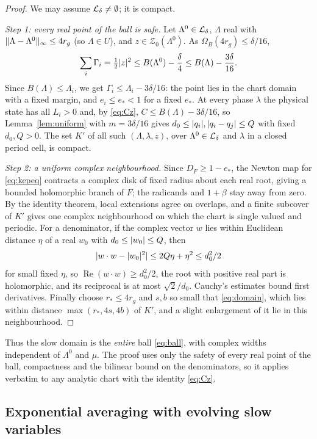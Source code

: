 \begin{proof}
We may assume $\mathcal{L}_\delta\neq\emptyset$; it is compact.

\emph{Step 1: every real point of the ball is safe.} Let $\Lambda^0\in\mathcal{L}_\delta$, $\Lambda$ real with $\lVert \Lambda-\Lambda^0\rVert_\infty\le4r_g$ (so $\Lambda\in U$), and $z\in\mathcal Z_0(\Lambda^0)$. As $\Omega_B(4r_g)\le\delta/16$,
\[
\sum_i\Gamma_i=\tfrac12\lvert z\rvert^2\le B(\Lambda^0)-\frac\delta4\le B(\Lambda)-\frac{3\delta}{16}.
\]
Since $B(\Lambda)\le\Lambda_i$, we get $\Gamma_i\le\Lambda_i-3\delta/16$: the point lies in the chart domain with a fixed margin, and $e_i\le e_*<1$ for a fixed $e_*$. At every phase $\lambda$ the physical state has all $L_i>0$ and, by \eqref{eq:Cz}, $C\le B(\Lambda)-3\delta/16$, so Lemma~\ref{lem:uniform} with $m=3\delta/16$ gives $d_0\le\lvert q_i\rvert,\lvert q_i-q_j\rvert\le Q$ with fixed $d_0,Q>0$. The set $K'$ of all such $(\Lambda,\lambda,z)$, over $\Lambda^0\in\mathcal{L}_\delta$ and $\lambda$ in a closed period cell, is compact.

\emph{Step 2: a uniform complex neighbourhood.} Since $D_F\ge1-e_*$, the Newton map for \eqref{eq:kepeq} contracts a complex disk of fixed radius about each real root, giving a bounded holomorphic branch of $F$; the radicands and $1+\beta$ stay away from zero. By the identity theorem, local extensions agree on overlaps, and a finite subcover of $K'$ gives one complex neighbourhood on which the chart is single valued and periodic. For a denominator, if the complex vector $w$ lies within Euclidean distance $\eta$ of a real $w_0$ with $d_0\le\lvert w_0\rvert\le Q$, then
\[
\lvert w\cdot w-\lvert w_0\rvert^2\rvert\le2Q\eta+\eta^2\le d_0^2/2
\]
for small fixed $\eta$, so $\operatorname{Re}(w\cdot w)\ge d_0^2/2$, the root with positive real part is holomorphic, and its reciprocal is at most $\sqrt2/d_0$. Cauchy's estimates bound first derivatives. Finally choose $r_*\le4r_g$ and $s,b$ so small that \eqref{eq:domain}, which lies within distance $\max(r_*,4s,4b)$ of $K'$, and a slight enlargement of it lie in this neighbourhood.
\end{proof}

Thus the slow domain is the \emph{entire} ball \eqref{eq:ball}, with complex widths independent of $\Lambda^0$ and $\mu$. The proof uses only the safety of every real point of the ball, compactness and the bilinear bound on the denominators, so it applies verbatim to any analytic chart with the identity \eqref{eq:Cz}.

\subsection{Exponential averaging with evolving slow variables}

